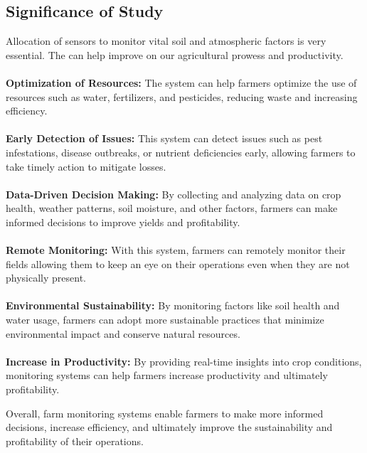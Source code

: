 \documentclass[12pt, a4paper]{article}
\begin{document}
\subsection{Significance of Study}
Allocation of sensors to monitor vital soil and atmospheric factors is very essential. The can help improve on our agricultural prowess and productivity. 
\\ \\
\textbf{Optimization of Resources:} The system can help farmers optimize the use of resources such as water, fertilizers, and pesticides, reducing waste and increasing efficiency.
\\ \\
\textbf{Early Detection of Issues:} This system can detect issues such as pest infestations, disease outbreaks, or nutrient deficiencies early, allowing farmers to take timely action to mitigate losses.
\\ \\
\textbf{Data-Driven Decision Making:} By collecting and analyzing data on crop health, weather patterns, soil moisture, and other factors, farmers can make informed decisions to improve yields and profitability.
\\ \\
\textbf{Remote Monitoring:} With this system, farmers can remotely monitor their fields allowing them to keep an eye on their operations even when they are not physically present.
\\ \\
\textbf{Environmental Sustainability:} By monitoring factors like soil health and water usage, farmers can adopt more sustainable practices that minimize environmental impact and conserve natural resources.
\\ \\
\textbf{Increase in Productivity:} By providing real-time insights into crop conditions, monitoring systems can help farmers increase productivity and ultimately profitability.


Overall, farm monitoring systems enable farmers to make more informed decisions, increase efficiency, and ultimately improve the sustainability and profitability of their operations.

\newpage
\end{document}
